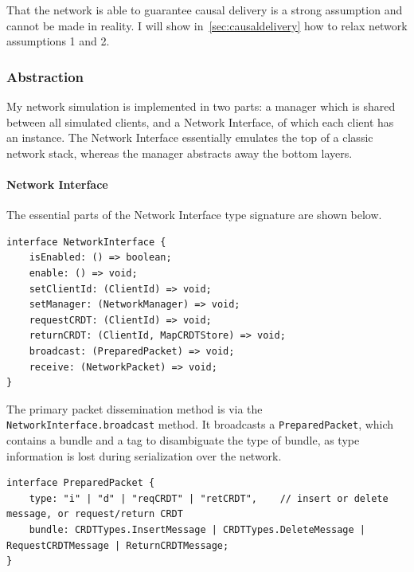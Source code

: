 \documentclass[12pt,a4paper,twoside,openright]{report}
\begin{document}
		That the network is able to guarantee causal delivery is a strong assumption and cannot be made in reality. I will show in~\cref{sec:causaldelivery} how to relax network assumptions 1 and 2.
		
		\subsubsection{Abstraction}
		My network simulation is implemented in two parts: a manager which is shared between all simulated clients, and a Network Interface, of which each client has an instance. The Network Interface essentially emulates the top of a classic network stack, whereas the manager abstracts away the bottom layers. 

		\paragraph{Network Interface} The essential parts of the Network Interface type signature are shown below.
		
\begin{lstlisting}[caption=NetworkInterface Type Signature]
interface NetworkInterface {
	isEnabled: () => boolean;
	enable: () => void;
	setClientId: (ClientId) => void;
	setManager: (NetworkManager) => void;
	requestCRDT: (ClientId) => void;
	returnCRDT: (ClientId, MapCRDTStore) => void;
	broadcast: (PreparedPacket) => void;
	receive: (NetworkPacket) => void;
}
\end{lstlisting}

		The primary packet dissemination method is via the \lstinline|NetworkInterface.broadcast| method. It broadcasts a \lstinline|PreparedPacket|, which contains a bundle and a tag to disambiguate the type of bundle, as type information is lost during serialization over the network.

\begin{lstlisting}	
interface PreparedPacket {
	type: "i" | "d" | "reqCRDT" | "retCRDT",    // insert or delete message, or request/return CRDT
	bundle: CRDTTypes.InsertMessage | CRDTTypes.DeleteMessage | RequestCRDTMessage | ReturnCRDTMessage;
}
\end{lstlisting}
		
\end{document}
